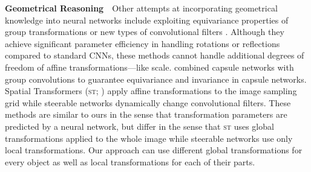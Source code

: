 \textbf{Geometrical Reasoning}\ \ 
Other attempts at incorporating geometrical knowledge into neural networks include exploiting equivariance properties of group transformations \citep{Cohen2016group} or new types of convolutional filters \citep{mallat,kocvok}.
Although they achieve significant parameter efficiency in handling rotations or reflections compared to standard \glspl{CNN}, these methods cannot handle additional degrees of freedom of affine transformations---like scale. \cite{lenssen} combined capsule networks with group convolutions to  guarantee equivariance and invariance in capsule networks.
Spatial Transformers (\textsc{st}; \cite{Jaderberg2015}) apply affine transformations to the image sampling grid while steerable networks \citep{Cohen2016steerable,Jacobsen2017dynamic} dynamically change convolutional filters.
These methods are similar to ours in the sense that transformation parameters are predicted by a neural network, but differ in the sense that \textsc{st} uses global transformations applied to the whole image while steerable networks use only local transformations.
Our approach can use different global transformations for every object as well as local transformations for each of their parts.




